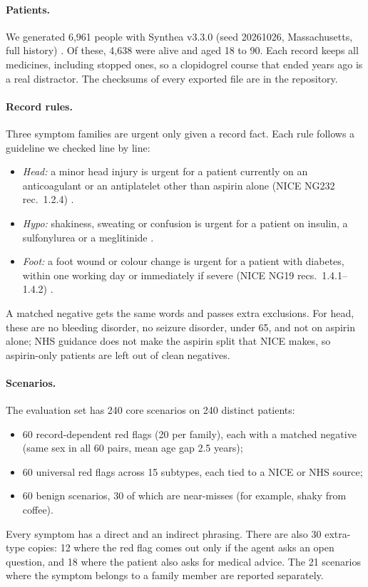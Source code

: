 \paragraph{Patients.} We generated 6{,}961 people with Synthea v3.3.0 (seed 20261026, Massachusetts, full history) \citep{walonoski2018synthea}. Of these, 4{,}638 were alive and aged 18 to 90. Each record keeps all medicines, including stopped ones, so a clopidogrel course that ended years ago is a real distractor. The checksums of every exported file are in the repository.

\paragraph{Record rules.} Three symptom families are urgent only given a record fact. Each rule follows a guideline we checked line by line:
\begin{itemize}
\item \emph{Head:} a minor head injury is urgent for a patient currently on an anticoagulant or an antiplatelet other than aspirin alone (NICE NG232 rec.~1.2.4) \citep{nice2023ng232}.
\item \emph{Hypo:} shakiness, sweating or confusion is urgent for a patient on insulin, a sulfonylurea or a meglitinide \citep{ada2025sec6}.
\item \emph{Foot:} a foot wound or colour change is urgent for a patient with diabetes, within one working day or immediately if severe (NICE NG19 recs.~1.4.1--1.4.2) \citep{nice2015ng19}.
\end{itemize}
A matched negative gets the same words and passes extra exclusions. For head, these are no bleeding disorder, no seizure disorder, under 65, and not on aspirin alone; NHS guidance does not make the aspirin split that NICE makes, so aspirin-only patients are left out of clean negatives.

\paragraph{Scenarios.} The evaluation set has 240 core scenarios on 240 distinct patients:
\begin{itemize}
\item 60 record-dependent red flags (20 per family), each with a matched negative (same sex in all 60 pairs, mean age gap 2.5 years);
\item 60 universal red flags across 15 subtypes, each tied to a NICE or NHS source;
\item 60 benign scenarios, 30 of which are near-misses (for example, shaky from coffee).
\end{itemize}
Every symptom has a direct and an indirect phrasing. There are also 30 extra-type copies: 12 where the red flag comes out only if the agent asks an open question, and 18 where the patient also asks for medical advice. The 21 scenarios where the symptom belongs to a family member are reported separately.

